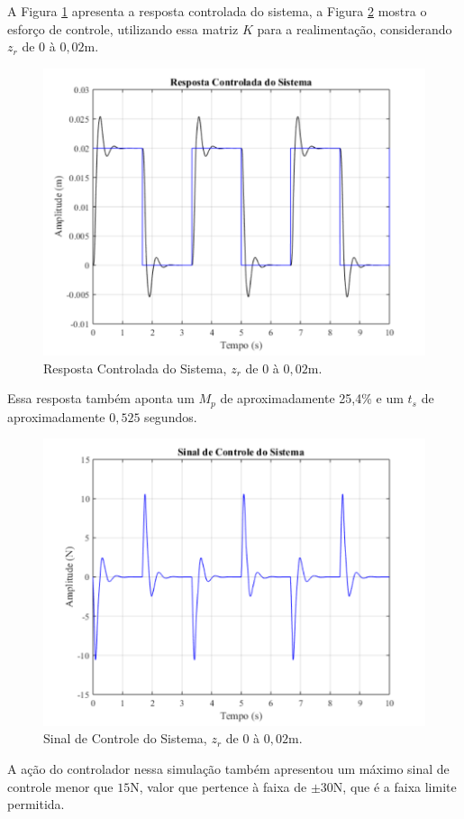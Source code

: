 \documentclass[journal,brazil,english]{IEEEtran}
\begin{document}
A Figura \ref{quanserEE} apresenta a resposta controlada do sistema, a Figura \ref{quanserEE2} mostra o esforço de controle, utilizando essa matriz $K$ para a realimentação, considerando $z_r$ de $0$ à $0,02$m.

\begin{figure}[H]
	\centering
\includegraphics[width=\columnwidth]{./imagens/quanserEE.pdf}
    \renewcommand{\figurename}{Fig.}
    \caption{Resposta Controlada do Sistema, $z_r$ de $0$ à $0,02$m.}
	\label{quanserEE}
\end{figure}
Essa resposta também aponta um $M_p$ de aproximadamente 25,4\% e um $t_s$ de aproximadamente $0,525$ segundos.

\begin{figure}[H]
	\centering
\includegraphics[width=\columnwidth]{./imagens/quanserEE2.pdf}
    \renewcommand{\figurename}{Fig.}
    \caption{Sinal de Controle do Sistema, $z_r$ de $0$ à $0,02$m.}
	\label{quanserEE2}
\end{figure}
A ação do controlador nessa simulação também apresentou um máximo sinal de controle menor que $15$N, valor que pertence à faixa de $\pm 30$N, que é a faixa limite permitida.
\end{document}
